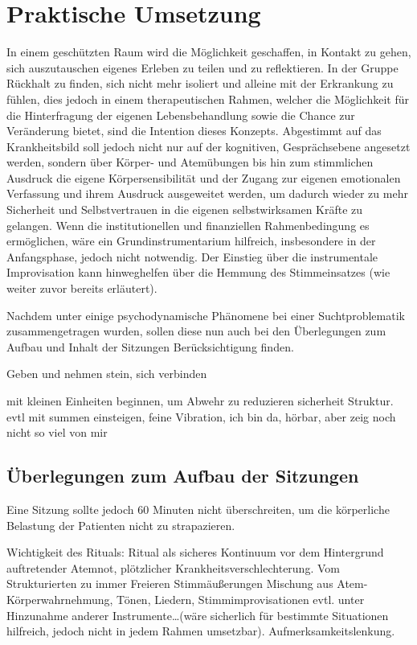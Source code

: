 \section{Praktische Umsetzung}
In einem geschützten Raum wird die Möglichkeit geschaffen, in Kontakt zu gehen, sich auszutauschen eigenes Erleben zu teilen und zu reflektieren. In der Gruppe Rückhalt zu finden, sich nicht mehr isoliert und alleine mit der Erkrankung zu fühlen, dies jedoch in einem therapeutischen Rahmen, welcher die Möglichkeit für die Hinterfragung der eigenen Lebensbehandlung sowie die Chance zur Veränderung bietet, sind die Intention dieses Konzepts. Abgestimmt auf das Krankheitsbild soll jedoch nicht nur auf der kognitiven, Gesprächsebene angesetzt werden, sondern über Körper- und Atemübungen bis hin zum stimmlichen Ausdruck die eigene Körpersensibilität und der Zugang zur eigenen emotionalen Verfassung und ihrem Ausdruck ausgeweitet werden, um dadurch wieder zu mehr Sicherheit und Selbstvertrauen in die eigenen selbstwirksamen Kräfte zu gelangen. Wenn die institutionellen und finanziellen Rahmenbedingung es ermöglichen, wäre ein Grundinstrumentarium hilfreich, insbesondere in der Anfangsphase, jedoch nicht notwendig. Der Einstieg über die instrumentale Improvisation kann hinweghelfen über die Hemmung des Stimmeinsatzes (wie weiter zuvor bereits erläutert).  

Nachdem unter \label{psychodynamische ueberlegungen} einige psychodynamische Phänomene bei einer Suchtproblematik zusammengetragen wurden, sollen diese nun auch bei den Überlegungen zum Aufbau und Inhalt der Sitzungen Berücksichtigung finden. 



Geben und nehmen stein, sich verbinden

mit kleinen Einheiten beginnen, um Abwehr zu reduzieren sicherheit Struktur. evtl mit summen einsteigen, feine Vibration, ich bin da, hörbar, aber zeig noch nicht so viel von mir


\subsection{Überlegungen zum Aufbau der Sitzungen}

Eine Sitzung sollte jedoch 60 Minuten nicht überschreiten, um die körperliche Belastung der Patienten nicht zu strapazieren.

Wichtigkeit des Rituals: Ritual als sicheres Kontinuum vor dem Hintergrund auftretender Atemnot, plötzlicher Krankheitsverschlechterung. 
Vom Strukturierten zu immer Freieren Stimmäußerungen
Mischung aus Atem- Körperwahrnehmung, Tönen, Liedern, Stimmimprovisationen evtl. unter Hinzunahme anderer Instrumente…(wäre sicherlich für bestimmte Situationen hilfreich, jedoch nicht in jedem Rahmen umsetzbar). 
Aufmerksamkeitslenkung. 

